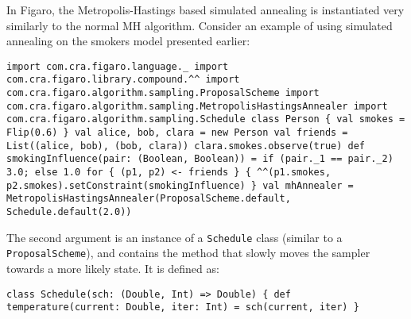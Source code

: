 In Figaro, the Metropolis-Hastings based simulated annealing is instantiated very similarly to the normal MH algorithm. Consider an example of using simulated annealing on the smokers model presented earlier:

\begin{flushleft}
\texttt{import com.cra.figaro.language.\_
\newline import com.cra.figaro.library.compound.\textasciicircum\textasciicircum
\newline import com.cra.figaro.algorithm.sampling.ProposalScheme
\newline import com.cra.figaro.algorithm.sampling.MetropolisHastingsAnnealer 
\newline import com.cra.figaro.algorithm.sampling.Schedule
\newline 
\newline class Person \{
\newline \tab val smokes = Flip(0.6)
\newline \}
\newline 
\newline val alice, bob, clara = new Person
\newline val friends = List((alice, bob), (bob, clara))
\newline clara.smokes.observe(true)
\newline 
\newline def smokingInfluence(pair: (Boolean, Boolean)) =
\newline \tab if (pair.\_1 == pair.\_2) 3.0; else 1.0
\newline 
\newline for \{ (p1, p2) <- friends \} \{
\newline \tab \textasciicircum\textasciicircum(p1.smokes, p2.smokes).setConstraint(smokingInfluence)
\newline \}
\newline 
\newline val mhAnnealer = MetropolisHastingsAnnealer(ProposalScheme.default, Schedule.default(2.0)) }
\end{flushleft}

The second argument is an instance of a \texttt{Schedule} class (similar to a \texttt{ProposalScheme}), and contains the method that slowly moves the sampler towards a more likely state. It is defined as:

\begin{flushleft}
\texttt{class Schedule(sch: (Double, Int) => Double) \{
\newline \tab def temperature(current: Double, iter: Int) = sch(current, iter)
\newline \} }
\end{flushleft}

